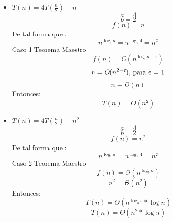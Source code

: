 \documentclass[10pt,a4paper]{article}
\begin{document}
	\begin{itemize}
		\item $T(n) = 4T(\frac{n}{2})+n$
			\begin{equation*}
				a = 4
			\end{equation*}
			\begin{equation*}
				b = 2
			\end{equation*}
			\begin{equation*}
				f(n) = n
			\end{equation*}
			De tal forma que :
			\begin{equation*}
				n^{\log_{b}{a}} = n^{\log_{2}{4}} = n^{2}
			\end{equation*}
			Caso 1 Teorema Maestro
			\begin{equation*}
				f(n) = O(n^{\log_{b}{a}-\varepsilon})
			\end{equation*}
			\begin{equation*}
				n = O(n^{2-\varepsilon}) \textup{, para e = 1}
			\end{equation*}
			\begin{equation*}
				n = O(n)
			\end{equation*}
			Entonces:
			\begin{equation*}
				T(n) = O(n^{2})
			\end{equation*}
			
		\item $T(n) = 4T(\frac{n}{2})+n^{2}$
			\begin{equation*}
				a = 4
			\end{equation*}
			\begin{equation*}
				b = 2
			\end{equation*}
			\begin{equation*}
				f(n) = n^{2}
			\end{equation*}
			De tal forma que :
			\begin{equation*}
				n^{\log_{b}{a}} = n^{\log_{2}{4}} = n^{2}
			\end{equation*}
			Caso 2 Teorema Maestro
			\begin{equation*}
				f(n) = \Theta (n^{\log_{b}{a}})
			\end{equation*}
			\begin{equation*}
				n^{2} = \Theta (n^{2})
			\end{equation*}
			Entonces:
			\begin{equation*}
				T(n) = \Theta(n^{\log_{b}{a}}*\log{n})
			\end{equation*}
			\begin{equation*}
				T(n) = \Theta(n^{2}*\log{n})
			\end{equation*}
			

\end{itemize}
\end{document}
